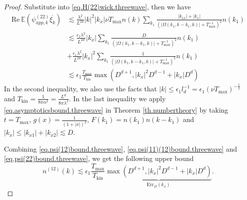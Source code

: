 \begin{proof}
Substitute into \eqref{eq.H(22)wick.threewave}, then we have
\begin{equation}\label{eq.psi(22)bound.threewave}
\begin{split}
    \text{Re}\  \mathbb E \left(\psi^{(22)}_{app,k}\overline{\xi_k}\right)&\lesssim\frac{\lambda^2}{L^{2d}} |k|^2|k_x|\nu T_{\text{max}}n(k)\sum\limits_{k_1} \frac{|k_{1x}|+|k_x|}{(|\Omega(k_1,k-k_1,k)|+T^{-1}_{\text{max}})^2}n(k_1)
    \\
    &\lesssim \frac{\epsilon_1\lambda^2}{L^{2d}}|k_x|\sum\limits_{k_1} \frac{D}{(|\Omega(k_1,k-k_1,k)|+T^{-1}_{\text{max}})^2}n(k_1)
    \\
    &+\frac{\epsilon_1\lambda^2}{L^{2d}}|k_x|^2\sum\limits_{k_1} \frac{1}{(|\Omega(k_1,k-k_1,k)|+T^{-1}_{\text{max}})^2}n(k_1)
    \\
    &\lesssim \epsilon_1\frac{T_{\text{max}}}{T_{\text{kin}}}\max(D^{d+1},|k_x|^2D^{d-1}+|k_x|D^{d})
\end{split}
\end{equation}
In the second inequality, we also use the facts that $|k|\le \epsilon_1 l_{d}^{-1}=\epsilon_1 (\nu T_{\text{max}})^{-\frac{1}{2}}$ and $T_{\text{kin}}=\frac{1}{8\pi\alpha^2}=\frac{L^{d}}{8\pi\lambda^2}$. In the last inequality we apply \eqref{eq.asymptoticsbound.threewave} in Theorem \ref{th.numbertheory} by taking $t=T_{\text{max}}$, $g(x)=\frac{1}{(1+|x|)^2}$, $F(k_1)=n(k_1) n(k-k_1)$ and $|k_x|\le |k_{x1}|+|k_{x2}|\lesssim D$. 


Combining \eqref{eq.psi(12)bound.threewave}, \eqref{eq.psi(11)(12)bound.threewave} and \eqref{eq.psi(22)bound.threewave}, we get the following upper bound
\begin{equation}\label{eq.n(12)final.threewave}
    n^{(12)}(k)\lesssim \epsilon_1\frac{T_{\text{max}}}{T_{\text{kin}}}\underbrace{\max(D^{d+1},|k_x|^2D^{d-1}+|k_x|D^{d})}_{\text{Err}_{D}(k_x)}.
\end{equation}


\end{proof}
